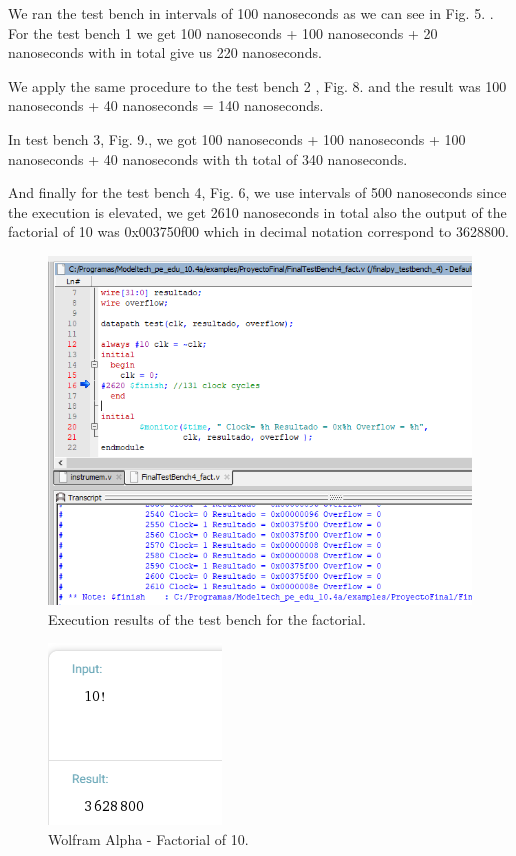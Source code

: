 \documentclass[conference]{IEEEtran}
\begin{document}
We ran the test bench in intervals of 100 nanoseconds as we can see in Fig. 5. \label{result1}. For the 
test bench 1 we get 100 nanoseconds + 100 nanoseconds + 20 nanoseconds with in total 
give us 220 nanoseconds.

We apply the same procedure to the test bench 2  \label{result3}, Fig. 8. and the result was
100 nanoseconds + 40 nanoseconds = 140 nanoseconds.

In test bench 3, Fig. 9., we got 100 nanoseconds + 100 nanoseconds + 100 nanoseconds 
+ 40 nanoseconds with th total of 340 nanoseconds.

And finally for the test bench 4, Fig. 6, we use intervals of 500 nanoseconds since the execution
is elevated, we get 2610 nanoseconds in total also the output of the factorial of 10 was 
0x003750f00 which in decimal notation correspond to 3628800.

\begin{figure}[h]
\includegraphics[scale=0.5]{ModelSim_factorial4_clock_cycles.png}
\caption{Execution results of the test bench for the factorial.}
\label{result_factorial}
\end{figure}

\begin{figure}[h]
\begin{center}
\includegraphics[scale=0.7]{factorial_10.png}
\caption{Wolfram Alpha - Factorial of 10. \cite{b6}}
\label{result_factorial}
\end{center}
\end{figure}
\end{document}
